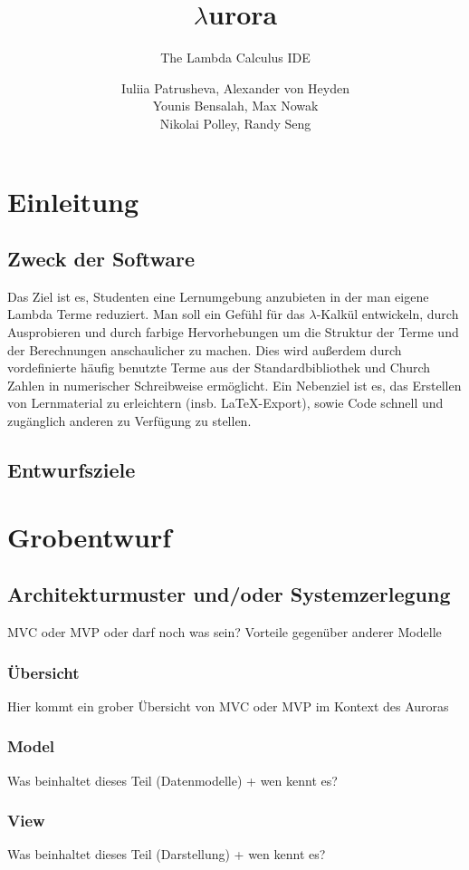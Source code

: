 \documentclass[parskip=full,11pt,twoside]{scrartcl}
\title{$\lambda$urora}
\subtitle{The Lambda Calculus IDE}
\author{Iuliia Patrusheva, Alexander von Heyden\\
Younis Bensalah, Max Nowak\\
Nikolai Polley, Randy Seng}
\begin{document}
\maketitle
\pagebreak
\tableofcontents
\pagebreak
\section{Einleitung}
\subsection{Zweck der Software}
Das Ziel ist es, Studenten eine Lernumgebung anzubieten in der man eigene Lambda Terme reduziert. Man soll ein Gefühl für das $\lambda$-Kalkül entwickeln, durch Ausprobieren
und durch farbige Hervorhebungen um die Struktur der Terme und der Berechnungen anschaulicher zu machen.
Dies wird außerdem durch vordefinierte häufig benutzte Terme aus der Standardbibliothek und Church Zahlen in numerischer Schreibweise ermöglicht.
Ein Nebenziel ist es, das Erstellen von Lernmaterial zu erleichtern (insb. \LaTeX-Export), sowie Code schnell und zugänglich anderen zu Verfügung zu stellen.
\subsection{Entwurfsziele}
\pagebreak

\section{Grobentwurf}
\subsection{Architekturmuster und/oder Systemzerlegung}
MVC oder MVP oder darf noch was sein?
Vorteile gegenüber anderer Modelle
\subsubsection{Übersicht}
Hier kommt ein grober Übersicht von MVC oder MVP im Kontext des Auroras
\subsubsection{Model}
Was beinhaltet dieses Teil (Datenmodelle) + wen kennt es?
\subsubsection{View}
Was beinhaltet dieses Teil (Darstellung) + wen kennt es?
\end{document}
